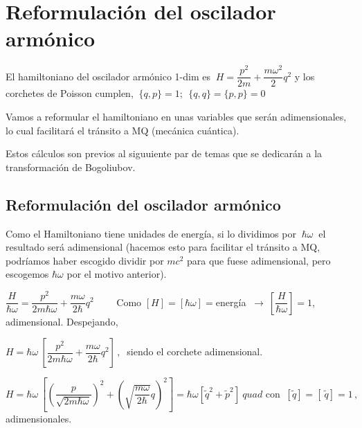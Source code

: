 \chapter{Reformulación del oscilador armónico}




\vspace{10mm}
\begin{adjustwidth}{50pt}{50pt}
\begin{ejemplo}

El hamiltoniano del oscilador armónico 1-dim es $\ H=\dfrac{p^2}{2m}+\dfrac{m\omega^2}{2}q^2$ y los corchetes de Poisson cumplen, $\ \{q,p\}=1;\ \ \{q,q\}=\{p,p\}=0$

Vamos a reformular el hamiltoniano en unas variables que serán adimensionales, lo cual facilitará el tránsito a MQ (mecánica cuántica). 

Estos cálculos son previos al siguuiente par de temas que se dedicarán a la transformación de Bogoliubov.

\end{ejemplo}
\end{adjustwidth}
\vspace{5mm}
\section{Reformulación del oscilador armónico}

Como el Hamiltoniano tiene unidades de energía, si lo dividimos por  $\ \hbar \omega\ $ el resultado será adimensional (hacemos esto para facilitar el tránsito a MQ, podríamos haber escogido dividir por $mc^2$ para que fuese adimensional, pero escogemos $\hbar \omega$ por el motivo anterior).


$\dfrac{H}{\hbar \omega} = \dfrac{p^2}{2m\hbar \omega} + \dfrac{m\omega}{2\hbar} q^2 \qquad$ Como $[H]=[\hbar \omega]=$energía $\ \to \ \left[ \dfrac{H}{\hbar \omega} \right]=1$, adimensional. Despejando,

$H = \hbar \omega \ \left[ \dfrac {p^2}{2m\hbar \omega } + \dfrac{m\omega}{2\hbar} q^2 \right]\, , \ $ siendo el corchete adimensional.

$H = \hbar \omega \ \left[  \left( \dfrac{p}{\sqrt{2m\hbar \omega}} \right)^2 + \left( \sqrt{\dfrac{m\omega}{2\hbar}} q\right)^2 \right] = \hbar \omega \left[ \widetilde q^2+ \widetilde p^2   \right]\ quad \text{ con } \ [\widetilde q]=[\ \widetilde q]=1\, , \ $ adimensionales.


